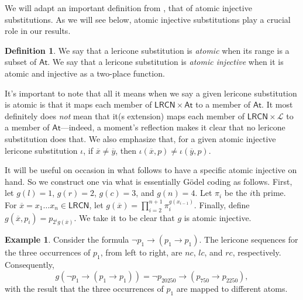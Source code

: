 \documentclass{amsart}
\theoremstyle{definition}
\newtheorem{ex}{Example}
\newtheorem{mdef}{Definition}
\newcommand{\LL}{\mathcal{L}}
\newcommand{\At}{\mathsf{At}}
\newcommand{\LRCN}{\mathsf{LRCN}}
\begin{document}
We will adapt an important definition from \citet{Leach-Krouse2024-LEALIT-4}, that of atomic injective substitutions. As we will see below, atomic injective substitutions play a crucial role in our results.
\begin{mdef}
    We say that a lericone substitution is \emph{atomic} when its range is a subset of $\At$. We say that a lericone substitution is \emph{atomic injective} when it is atomic and injective as a two-place function.
\end{mdef}
\noindent
It's important to note that all it means when we say a given lericone substitution is atomic is that it maps each member of $\LRCN\times\At$ to a member of $\At$. It most definitely does \textit{not} mean that it(s extension) maps each member of $\LRCN\times\LL$ to a member of $\At$---indeed, a moment's reflection makes it clear that no lericone substitution does that. We also emphasize that, for a given atomic injective lericone substitution $\iota$, if $\overline{x}\neq\overline{y}$, then $\iota(\overline{x},p)\neq \iota(\overline{y}, p)$.

It will be useful on occasion in what follows to have a specific atomic injective on hand. So we construct one via what is essentially G\"odel coding as follows. First, let $g(l)=1$, $g(r)=2$, $g(c)=3$, and $g(n)=4$. Let $\pi_i$ be the $i$th prime. For $\overline{x}=x_1\dots x_n\in\LRCN$, let $g(\overline{x})=\prod_{i=2}^{n+1}\pi_i^{g(x_{i-1})}$. Finally, define $g(\overline{x},p_i)=p_{2^ig(\overline{x})}$. We take it to be clear that $g$ is atomic injective.

\begin{ex}
Consider the formula $\neg p_1\to(p_1\to p_1)$. The lericone sequences for the three occurrences of $p_1$, from left to right, are $nc$, $lc$, and $rc$, respectively. Consequently, 
\[
g(\neg p_1\to(p_1\to p_1))=\neg p_{20250}\to(p_{750}\to p_{2250}),
\]
with the result that the three occurrences of $p_1$ are mapped to different atoms.
\end{ex}
\end{document}

